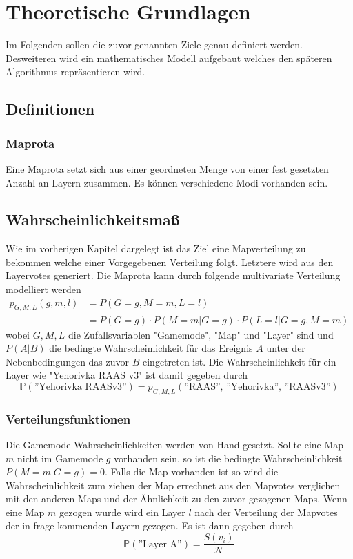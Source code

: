 \section{Theoretische Grundlagen}
    Im Folgenden sollen die zuvor genannten Ziele genau definiert werden. 
    Desweiteren wird ein mathematisches Modell aufgebaut welches den späteren Algorithmus repräsentieren wird.
    \subsection{Definitionen}
    \subsubsection{Maprota}
    Eine Maprota setzt sich aus einer geordneten Menge von einer fest gesetzten Anzahl an Layern zusammen. 
    Es können verschiedene Modi vorhanden sein.
    \subsection{Wahrscheinlichkeitsmaß}
        Wie im vorherigen Kapitel dargelegt ist das Ziel eine Mapverteilung zu bekommen welche einer Vorgegebenen Verteilung folgt. 
        Letztere wird aus den Layervotes generiert.
        Die Maprota kann durch folgende multivariate Verteilung modelliert werden
        \begin{align}
            p_{G,M,L}(g,m,l)    &= P(G=g, M=m, L=l) \\
                                &= P(G=g)\cdot P(M=m|G=g) \cdot P(L=l|G=g, M=m)
        \end{align}
        wobei $G,M,L$ die Zufallsvariablen "Gamemode", "Map" und "Layer" sind und $P(A|B)$ die bedingte Wahrscheinlichkeit für das Ereignis $A$ unter der Nebenbedingungen das zuvor $B$ eingetreten ist.
        Die Wahrscheinlichkeit für ein Layer wie "Yehorivka RAAS v3" ist damit gegeben durch 
        \begin{equation*}
            \mathbb{P}(\text{''Yehorivka RAASv3''}) = p_{G,M,L}(\text{''RAAS'', ''Yehorivka'', ''RAASv3''})
        \end{equation*}
        \subsubsection{Verteilungsfunktionen}
        Die Gamemode Wahrscheinlichkeiten werden von Hand gesetzt. 
        Sollte eine Map $m$ nicht im Gamemode $g$ vorhanden sein, so ist die bedingte Wahrscheinlichkeit $P(M=m|G=g) = 0$. 
        Falls die Map vorhanden ist so wird die Wahrscheinlichkeit zum ziehen der Map errechnet aus den Mapvotes verglichen mit den anderen Maps und der Ähnlichkeit zu den zuvor gezogenen Maps.
        Wenn eine Map $m$ gezogen wurde wird ein Layer $l$ nach der Verteilung der Mapvotes der in frage kommenden Layern gezogen. 
        Es ist dann gegeben durch 
        \begin{equation}
            \mathbb{P}(\text{''Layer A''}) = \frac{S(v_i)}{\mathcal{N}}
        \end{equation}
